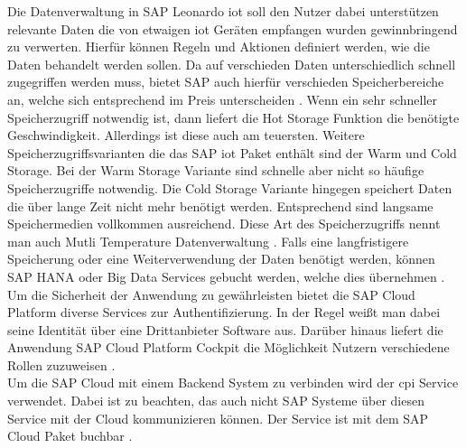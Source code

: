 \noindent Die Datenverwaltung in SAP Leonardo \ac{iot} soll den Nutzer dabei unterstützen relevante Daten die von etwaigen \ac{iot} Geräten empfangen wurden gewinnbringend zu verwerten. Hierfür können Regeln und Aktionen definiert werden, wie die Daten behandelt werden sollen. Da auf verschieden Daten unterschiedlich schnell zugegriffen werden muss, bietet SAP auch hierfür verschieden Speicherbereiche an, welche sich entsprechend im Preis unterscheiden \cite[Seite 173]{Holtschulte20:IOS}. Wenn ein sehr schneller Speicherzugriff notwendig ist, dann liefert die Hot Storage Funktion die benötigte Geschwindigkeit. Allerdings ist diese auch am teuersten. Weitere Speicherzugriffsvarianten die das SAP \ac{iot} Paket enthält sind der Warm und Cold Storage. Bei der Warm Storage Variante sind schnelle aber nicht so häufige Speicherzugriffe notwendig. Die Cold Storage Variante hingegen speichert Daten die über lange Zeit nicht mehr benötigt werden. Entsprechend sind langsame Speichermedien vollkommen ausreichend. Diese Art des Speicherzugriffs nennt man auch Mutli Temperature Datenverwaltung \cite[Seite 118f]{Holtschulte20:IOS}. Falls eine langfristigere Speicherung oder eine Weiterverwendung der Daten benötigt werden, können SAP HANA oder Big Data Services gebucht werden, welche dies übernehmen \cite[Seite 173]{Holtschulte20:IOS}.\\    

\noindent Um die Sicherheit der Anwendung zu gewährleisten bietet die SAP Cloud Platform diverse Services zur Authentifizierung. In der Regel weißt man dabei seine Identität über eine Drittanbieter Software aus. Darüber hinaus liefert die Anwendung SAP Cloud Platform Cockpit die Möglichkeit Nutzern verschiedene Rollen zuzuweisen \cite[Seite 176ff]{Holtschulte20:IOS}.\\

\noindent Um die SAP Cloud mit einem Backend System zu verbinden wird der \ac{cpi}  Service verwendet. Dabei ist zu beachten, das auch nicht SAP Systeme über diesen Service mit der Cloud kommunizieren können. Der Service ist mit dem SAP Cloud Paket buchbar \cite[Seite 146]{Holtschulte20:IOS}.\\

